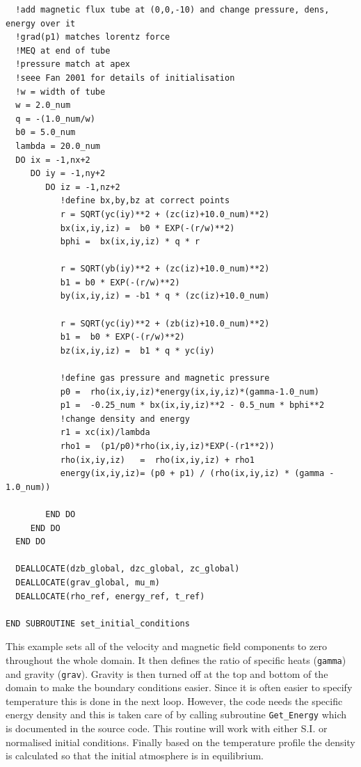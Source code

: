 \documentclass[11pt]{article}
\begin{document}
\begin{verbatim}
  !add magnetic flux tube at (0,0,-10) and change pressure, dens, energy over it
  !grad(p1) matches lorentz force
  !MEQ at end of tube
  !pressure match at apex
  !seee Fan 2001 for details of initialisation
  !w = width of tube
  w = 2.0_num
  q = -(1.0_num/w)
  b0 = 5.0_num
  lambda = 20.0_num
  DO ix = -1,nx+2
     DO iy = -1,ny+2
        DO iz = -1,nz+2
           !define bx,by,bz at correct points
           r = SQRT(yc(iy)**2 + (zc(iz)+10.0_num)**2)
           bx(ix,iy,iz) =  b0 * EXP(-(r/w)**2)
           bphi =  bx(ix,iy,iz) * q * r
  
           r = SQRT(yb(iy)**2 + (zc(iz)+10.0_num)**2)
           b1 = b0 * EXP(-(r/w)**2)
           by(ix,iy,iz) = -b1 * q * (zc(iz)+10.0_num)
  
           r = SQRT(yc(iy)**2 + (zb(iz)+10.0_num)**2)
           b1 =  b0 * EXP(-(r/w)**2)
           bz(ix,iy,iz) =  b1 * q * yc(iy)
  
           !define gas pressure and magnetic pressure
           p0 =  rho(ix,iy,iz)*energy(ix,iy,iz)*(gamma-1.0_num)
           p1 =  -0.25_num * bx(ix,iy,iz)**2 - 0.5_num * bphi**2
           !change density and energy
           r1 = xc(ix)/lambda
           rho1 =  (p1/p0)*rho(ix,iy,iz)*EXP(-(r1**2))
           rho(ix,iy,iz)   =  rho(ix,iy,iz) + rho1
           energy(ix,iy,iz)= (p0 + p1) / (rho(ix,iy,iz) * (gamma - 1.0_num))
  
        END DO
     END DO
  END DO              
  
  DEALLOCATE(dzb_global, dzc_global, zc_global)
  DEALLOCATE(grav_global, mu_m)
  DEALLOCATE(rho_ref, energy_ref, t_ref)

END SUBROUTINE set_initial_conditions
\end{verbatim}

This example sets all of the velocity and magnetic field components to zero throughout the whole domain. It then defines the ratio of specific heats (\texttt{gamma}) and gravity (\texttt{grav}). Gravity is then turned off at the top and bottom of the domain to make the boundary conditions easier. Since it is often easier to specify temperature this is done in the next loop. However, the code needs the specific energy density and this is taken care of by calling subroutine \texttt{Get\_Energy} which is documented in the source code. This routine will work with either S.I. or normalised initial conditions. Finally based on the temperature profile the density is calculated so that the initial atmosphere is in equilibrium.  
\end{document}
